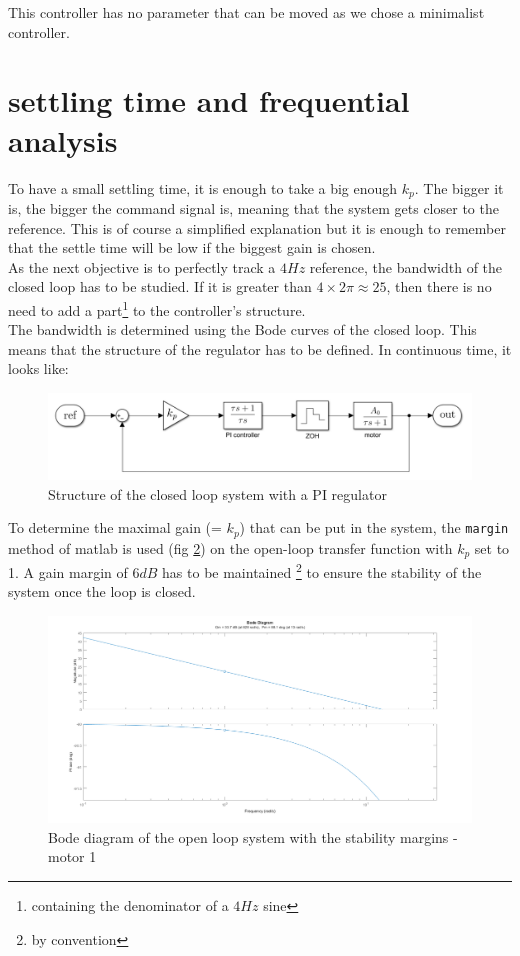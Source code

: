 This controller has no parameter that can be moved as we chose a minimalist controller. 
\fi

\section{settling time and frequential analysis}
\label{section:freq_analysis}

To have a small settling time, it is enough to take a big enough $k_p$. The bigger it is, the bigger the command signal is, meaning that the system gets closer to the reference. This is of course a simplified explanation but it is enough to remember that the settle time will be low if the biggest gain is chosen.\\
As the next objective is to perfectly track a $4 Hz$ reference, the bandwidth of the closed loop has to be studied. If
it is greater than $4 \times 2\pi \approx 25$, then there is no need to add a part\footnote{containing the denominator of a $4 Hz$ sine} to the controller's structure.\\
The bandwidth is determined using the Bode curves of the closed loop. This means that the structure of the regulator
has to be defined. In continuous time, it looks like:

\begin{figure}[H]
    \centering
    \includegraphics[width=\textwidth]{Pictures/controller_structure.png}
    \caption{Structure of the closed loop system with a PI regulator}
    \label{fig:CL structure}
\end{figure}

To determine the maximal gain (= $k_p$) that can be put in the system, the \texttt{margin} method of matlab is used (fig 
\ref{fig:OL bode}) on the open-loop transfer function with $k_p$ set to 1. A gain margin of $6 dB$ has to be maintained 
\footnote{by convention} to ensure the stability of the system once the loop is closed. \\

\begin{figure}[H]
    \centering
    \includegraphics[width=\textwidth]{Pictures/bode_OL.png}
    \caption{Bode diagram of the open loop system with the stability margins - motor 1}
    \label{fig:OL bode}
\end{figure}

